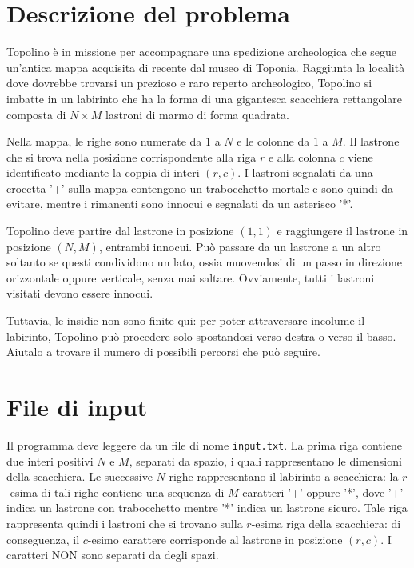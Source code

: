 \documentclass[a4paper,11pt]{article}
\newcommand{\file}[1]{\texttt{#1}}
\newcommand{\gara}{phd2015}
\newcommand{\nome}{Campo minato}
\newcommand{\nomebreve}{minato}
\begin{document}
\noindent{\Large \gara}
\vspace{0.5cm}

\noindent{\Huge \textbf \nome~(\texttt{\nomebreve})}

\section*{Descrizione del problema}
Topolino \`e in missione per accompagnare una spedizione archeologica che segue un'antica mappa
acquisita di recente dal museo di Toponia. Raggiunta la localit\`a dove dovrebbe trovarsi un
prezioso e raro reperto archeologico, Topolino si imbatte in un labirinto che ha la forma di una
gigantesca scacchiera rettangolare composta di $N \times M$ lastroni di marmo di forma quadrata.

Nella mappa, le righe sono numerate da $1$ a $N$ e le colonne da $1$ a $M$. Il lastrone che si
trova nella posizione corrispondente alla riga $r$ e alla colonna $c$ viene identificato mediante la
coppia di interi $(r, c)$. I lastroni segnalati da una crocetta '+' sulla mappa contengono un
trabocchetto mortale e sono quindi da evitare, mentre i rimanenti sono innocui e segnalati da un
asterisco '*'.

Topolino deve partire dal lastrone in posizione $(1, 1)$ e raggiungere il lastrone in posizione $(N, M)$,
entrambi innocui. Può passare da un lastrone a un altro soltanto se questi condividono un lato, ossia muovendosi di un passo in direzione orizzontale oppure verticale, senza mai saltare. Ovviamente, tutti i lastroni visitati devono essere innocui.

Tuttavia, le insidie non sono finite qui: per poter attraversare incolume il labirinto, Topolino può
procedere solo spostandosi verso destra o verso il basso. Aiutalo a trovare il numero di possibili 
percorsi che può seguire.

\section*{File di input}
Il programma deve leggere da un file di nome \file{input.txt}. La prima riga contiene due interi positivi $N$ e $M$, separati da spazio, i quali rappresentano le dimensioni della scacchiera.
Le successive $N$ righe rappresentano il labirinto a scacchiera: la $r$-esima di tali righe contiene una
sequenza di $M$ caratteri '+' oppure '*', dove '+' indica un lastrone con trabocchetto mentre '*' indica
un lastrone sicuro. Tale riga rappresenta quindi i lastroni che si trovano sulla $r$-esima riga della
scacchiera: di conseguenza, il $c$-esimo carattere corrisponde al lastrone in posizione $(r, c)$. I caratteri NON sono separati da degli spazi.
\end{document}
